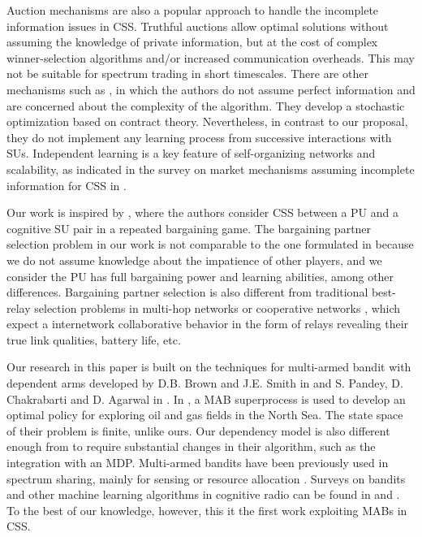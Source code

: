 Auction mechanisms are also a popular approach to handle the incomplete information issues in CSS.
Truthful auctions allow optimal solutions without assuming the knowledge of private information, but at the cost of complex winner-selection algorithms and/or increased communication overheads. 
This may not be suitable for spectrum trading in short timescales. There are other mechanisms such as \cite{ref:Duan2014}, in which the authors do not assume perfect information and are concerned about the complexity of the algorithm. They develop a stochastic optimization based on contract theory. Nevertheless, in contrast to our proposal, they do not implement any learning process from successive interactions with SUs. Independent learning is a key feature of self-organizing networks and scalability, as indicated in the survey on market mechanisms assuming incomplete information for CSS in \cite{ref:Huang2013}.

Our work is inspired by \cite{ref:Yan2013}, where the authors consider CSS between a PU and a cognitive SU pair in a repeated bargaining game. 
The bargaining partner selection problem in our work is not comparable to the one formulated in \cite{ref:Calvo2002} because we do not assume knowledge about the impatience of other players, and we consider the PU has full bargaining power and learning abilities, among other differences. 
Bargaining partner selection is also different from traditional best-relay selection problems in multi-hop networks or cooperative networks \cite{ref:Yuan2013,ref:Tran2014}, which expect a internetwork collaborative behavior in the form of relays revealing their true link qualities, battery life, etc.

Our research in this paper is built on the techniques for multi-armed bandit with dependent arms developed by D.B. Brown and J.E. Smith in \cite{ref:Brown2013} and S. Pandey, D. Chakrabarti and D. Agarwal in \cite{ref:Pandey2007}. In \cite{ref:Brown2013}, a MAB superprocess is used to develop an optimal policy for exploring oil and gas fields in the North Sea. The state space of their problem is finite, unlike ours. 
Our dependency model is also different enough from \cite{ref:Pandey2007} to require substantial changes in their algorithm, such as the integration with an MDP. 
Multi-armed bandits have been previously used in spectrum sharing, mainly for sensing or resource allocation \cite{ref:Si2010}. 
Surveys on bandits and other machine learning algorithms in cognitive radio can be found in \cite{ref:Bkassiny2013} and \cite{ref:Gavrilovska2013}.
To the best of our knowledge, however, this it the first work exploiting MABs in CSS. 

